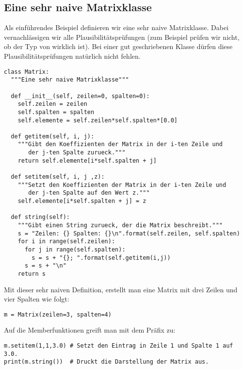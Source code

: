 \subsection{Eine sehr naive Matrixklasse}
\label{section:klassen:eine_sehr_naive_matrixklasse}
Als einführendes Beispiel definieren wir eine sehr naive Matrixklasse.
Dabei ver\-nach\-läs\-sig\-en wir alle Plausibilitätsprüfungen
(zum Beispiel prüfen wir nicht, ob der Typ von  wirklich  ist).
Bei einer gut geschriebenen Klasse dürfen diese Plausibilitätsprüfungen natürlich nicht fehlen.
\begin{lstlisting}
class Matrix:
  """Eine sehr naive Matrixklasse"""
  
  def __init__(self, zeilen=0, spalten=0):
    self.zeilen = zeilen
    self.spalten = spalten
    self.elemente = self.zeilen*self.spalten*[0.0]
  
  def getitem(self, i, j):
    """Gibt den Koeffizienten der Matrix in der i-ten Zeile und
       der j-ten Spalte zurueck."""
    return self.elemente[i*self.spalten + j]
  
  def setitem(self, i, j ,z):
    """Setzt den Koeffizienten der Matrix in der i-ten Zeile und
       der j-ten Spalte auf den Wert z."""
    self.elemente[i*self.spalten + j] = z
  
  def string(self):
    """Gibt einen String zurueck, der die Matrix beschreibt."""
    s = "Zeilen: {} Spalten: {}\n".format(self.zeilen, self.spalten)
    for i in range(self.zeilen):
      for j in range(self.spalten):
        s = s + "{}; ".format(self.getitem(i,j))
      s = s + "\n"
    return s
\end{lstlisting}
Mit dieser sehr naiven Definition, erstellt man eine Matrix mit drei Zeilen und vier Spalten wie folgt:
\begin{lstlisting}
m = Matrix(zeilen=3, spalten=4)
\end{lstlisting}
Auf die Memberfunktionen greift man mit dem Präfix  zu:
\begin{lstlisting}
m.setitem(1,1,3.0) # Setzt den Eintrag in Zeile 1 und Spalte 1 auf 3.0.
print(m.string())  # Druckt die Darstellung der Matrix aus.
\end{lstlisting}
